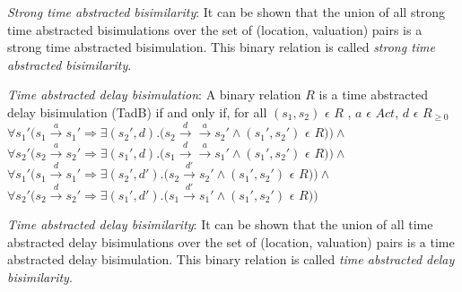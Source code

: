 \documentclass[a4paper]{llncs}
\begin{document}
\begin{definition}
  \emph{Strong time abstracted bisimilarity}: It can be shown that the union of all strong time abstracted
  bisimulations over the set of (location, valuation) pairs is a
  strong time abstracted bisimulation. This binary relation is called
  \textit{strong time abstracted bisimilarity}.
\end{definition}

\begin{definition}
  \emph{Time abstracted delay bisimulation}: A binary relation
  $R$ is a time abstracted delay bisimulation (TadB) if and only if, for all
  $(s_1, s_2)$ $\epsilon$ $R$ , $a$ $\epsilon$ $Act $, $d$ $\epsilon$ $R_{\ge 0}$\\
  $\forall s_1' (s_1 \xrightarrow{a} s_1' \Rightarrow \exists (s_2', d)
  . (s_2 \xrightarrow{d} \xrightarrow{a} s_2' \wedge (s_1', s_2')$ $\epsilon$ $R ) )
  \wedge $ \\
  $\forall s_2' (s_2 \xrightarrow{a} s_2' \Rightarrow \exists (s_1', d)
  . (s_1 \xrightarrow{d} \xrightarrow{a} s_1' \wedge (s_1', s_2')$
  $\epsilon$ $R ) ) 
  \wedge $ \\
  $\forall s_1' (s_1 \xrightarrow{d} s_1' \Rightarrow \exists (s_2',
  d')
  . (s_2 \xrightarrow{d'} s_2' \wedge (s_1', s_2')$ $\epsilon$ $R ) )
  \wedge $ \\
  $\forall s_2' (s_2 \xrightarrow{d} s_2' \Rightarrow \exists (s_1', d')
  . (s_1 \xrightarrow{d'} s_1' \wedge (s_1', s_2')$ $\epsilon$ $R ) ) $ \\
\end{definition}

\begin{definition}
  \emph{Time abstracted delay bisimilarity}: It can be shown that the
  union of all time abstracted delay bisimulations over the set of
  (location, valuation) pairs is a time abstracted delay
  bisimulation. This binary relation is called \textit{time abstracted
    delay bisimilarity}.
\end{definition}
\end{document}
